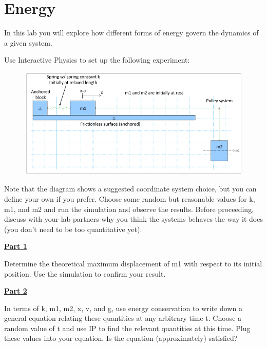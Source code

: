 \section{Energy}

In this lab you will explore how different forms of energy govern the dynamics of a given system.

Use Interactive Physics to set up the following experiment:
%
\begin{figure}[H]
\includegraphics[scale=0.70]{figures/energy/fig1.png}
\end{figure}
%
Note that the diagram shows a suggested coordinate system choice, but you can define your own if you prefer.
Choose some random but reasonable values for k, m1, and m2 and run the simulation and observe the results.
Before proceeding, discuss with your lab partners why you think the systems behaves the way it does (you don't need to be too quantitative yet).

\bigskip

\underline{\textbf{Part 1}} \par
Determine the theoretical maximum displacement of m1 with respect to its initial position.
Use the simulation to confirm your result.

\bigskip

\underline{\textbf{Part 2}} \par
In terms of k, m1, m2, x, v, and g, use energy conservation to write down a general equation relating these quantities at any arbitrary time t.
Choose a random value of t and use IP to find the relevant quantities at this time.
Plug these values into your equation.
Is the equation (approximately) satisfied?

\pagebreak \clearpage
